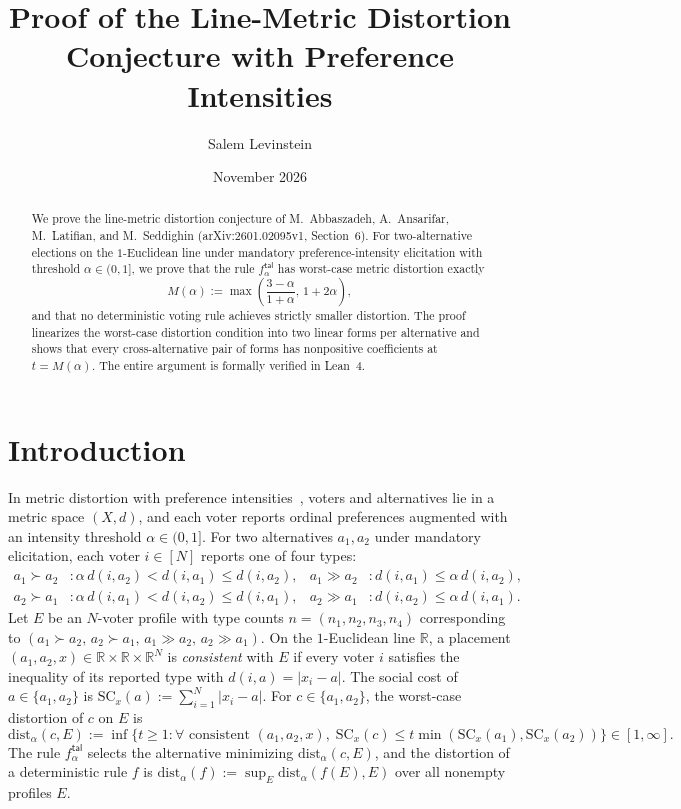 \documentclass[11pt]{article}
\title{Proof of the Line-Metric Distortion Conjecture with Preference Intensities}
\author{Salem Levinstein}
\date{November 2026}
\begin{document}
\maketitle

\begin{abstract}
We prove the line-metric distortion conjecture of M.~Abbaszadeh, A.~Ansarifar,
M.~Latifian, and M.~Seddighin (arXiv:2601.02095v1, Section~6). For
two-alternative elections on the $1$-Euclidean line under mandatory
preference-intensity elicitation with threshold $\alpha \in (0, 1]$, we prove
that the rule $f^{\mathsf{tal}}_\alpha$ has worst-case metric distortion
exactly
\[
M(\alpha) := \max\!\left(\frac{3 - \alpha}{1 + \alpha},\, 1 + 2\alpha\right),
\]
and that no deterministic voting rule achieves strictly smaller distortion.
The proof linearizes the worst-case distortion condition into two linear forms
per alternative and shows that every cross-alternative pair of forms has
nonpositive coefficients at $t = M(\alpha)$. The entire argument is formally
verified in Lean~4.
\end{abstract}

\section{Introduction}

In metric distortion with preference intensities~\cite{AALS2026}, voters and
alternatives lie in a metric space $(X, d)$, and each voter reports ordinal
preferences augmented with an intensity threshold $\alpha \in (0, 1]$. For two
alternatives $a_1, a_2$ under mandatory elicitation, each voter $i \in [N]$
reports one of four types:
\begin{align*}
a_1 \succ a_2 &: \alpha\, d(i, a_2) < d(i, a_1) \le d(i, a_2), &
a_1 \gg a_2 &: d(i, a_1) \le \alpha\, d(i, a_2), \\
a_2 \succ a_1 &: \alpha\, d(i, a_1) < d(i, a_2) \le d(i, a_1), &
a_2 \gg a_1 &: d(i, a_2) \le \alpha\, d(i, a_1).
\end{align*}
Let $E$ be an $N$-voter profile with type counts $n = (n_1, n_2, n_3, n_4)$
corresponding to $(a_1 \succ a_2,\, a_2 \succ a_1,\, a_1 \gg a_2,\,
a_2 \gg a_1)$. On the $1$-Euclidean line $\mathbb{R}$, a placement
$(a_1, a_2, x) \in \mathbb{R} \times \mathbb{R} \times \mathbb{R}^N$ is
\emph{consistent} with $E$ if every voter $i$ satisfies the inequality of its
reported type with $d(i, a) = |x_i - a|$. The social cost of $a \in \{a_1, a_2\}$
is $\mathrm{SC}_x(a) := \sum_{i=1}^N |x_i - a|$. For $c \in \{a_1, a_2\}$, the
worst-case distortion of $c$ on $E$ is
\[
\mathrm{dist}_\alpha(c, E) := \inf \bigl\{ t \ge 1 : \forall \text{ consistent }
(a_1, a_2, x),\; \mathrm{SC}_x(c) \le t \min(\mathrm{SC}_x(a_1), \mathrm{SC}_x(a_2)) \bigr\}
\in [1, \infty].
\]
The rule $f^{\mathsf{tal}}_\alpha$ selects the alternative minimizing
$\mathrm{dist}_\alpha(c, E)$, and the distortion of a deterministic rule $f$ is
$\mathrm{dist}_\alpha(f) := \sup_E \mathrm{dist}_\alpha(f(E), E)$ over all
nonempty profiles $E$.
\end{document}

